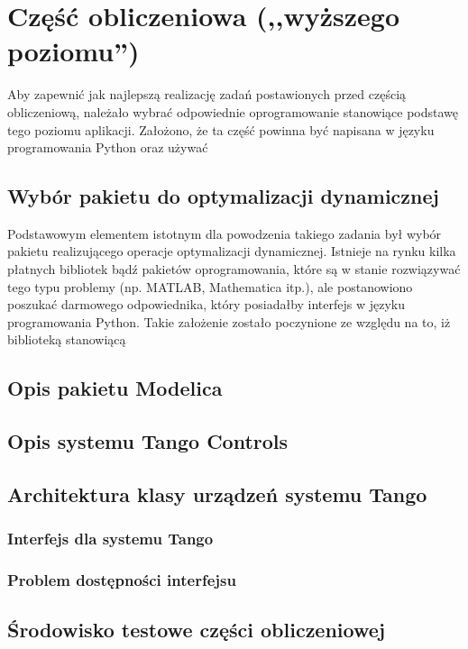 \section{Część obliczeniowa (,,wyższego poziomu'')}
\label{sec:czesc-wyzsza}

Aby zapewnić jak najlepszą realizację zadań postawionych przed częścią obliczeniową, należało wybrać odpowiednie oprogramowanie stanowiące podstawę tego poziomu aplikacji. Założono, że ta część powinna być napisana w języku programowania Python oraz używać 


\subsection{Wybór pakietu do optymalizacji dynamicznej}
\label{sub:czesc-wyzsza-wybor}

Podstawowym elementem istotnym dla powodzenia takiego zadania był wybór pakietu realizującego operacje optymalizacji dynamicznej. Istnieje na rynku kilka płatnych bibliotek bądź pakietów oprogramowania, które są w stanie rozwiązywać tego typu problemy (np. MATLAB, Mathematica itp.), ale postanowiono poszukać darmowego odpowiednika, który posiadałby interfejs w języku programowania Python. Takie założenie zostało poczynione ze względu na to, iż biblioteką stanowiącą 


\subsection{Opis pakietu Modelica}
\label{sub:czesc-wyzsza-modelica}


\subsection{Opis systemu Tango Controls}
\label{sub:czesc-wyzsza-tango}


\subsection{Architektura klasy urządzeń systemu Tango}
\label{sub:czesc-wyzsza-klasa}


\subsubsection{Interfejs dla systemu Tango}


\subsubsection{Problem dostępności interfejsu}



\subsection{Środowisko testowe części obliczeniowej}
\label{sub:czesc-wyzsza-docker}